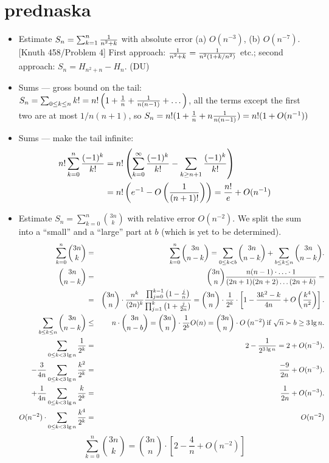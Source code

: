 \documentclass[10pt, a4paper]{article}
\begin{document}
\newpage

\section{prednaska}

\begin{itemize}

\item Estimate $S_n = \sum_{k=1}^n {1\over n^2+k}$ with absolute error (a) $O(n^{-3})$, (b) $O(n^{-7})$. [Knuth 458/Problem 4]
First approach: ${1\over n^2+k}={1\over n^2(1+k/n^2)}$ etc.; second approach: $S_n = H_{n^2+n}-H_n$. (DU)

\item Sums --- gross bound on the tail: $S_n = \sum_{0\le k\le n} k! = n!\left(1+{1\over n}+{1\over n(n-1)}+ \dots\right)$,
all the terms except the first two are at most $1/n(n+1)$, so $S_n = n!(1+{1\over n}+n{1\over n(n-1)}) = n!(1+O(n^{-1}))$

\item Sums --- make the tail infinite:
\begin{align*}
n!\sum_{k=0}^n{(-1)^k\over k!} &= n!\left(\sum_{k=0}^\infty{(-1)^k\over k!}-\sum_{k\ge n+1}{(-1)^k\over k!}\right)\\
                               &= n!\left(e^{-1}-O\left({1\over (n+1)!}\right)\right)= {n!\over e}+O(n^{-1})
\end{align*}

\item Estimate $S_n=\sum_{k=0}^n {3n\choose k}$ with relative error $O(n^{-2})$. We split the sum into a ``small'' and a ``large'' part at $b$ (which is yet to be determined).
\begin{eqnarray*}
\sum_{k=0}^{n} \binom {3n}k&=&\sum_{k=0}^{n} \binom {3n}{n-k}=\sum_{0\leq k<b} \binom {3n}{n-k}+\sum_{b\le k\le n} \binom {3n}{n-k}.\\
\binom{3n}{n-k} &=& \binom{3n}{n} {n(n-1)\cdot\ldots \cdot 1\over (2n+1)(2n+2)\ldots(2n+k)} =\\
                &=& \binom{3n}{n}\cdot\frac{n^k}{(2n)^k}\frac{\prod_{j=0}^{k-1}\left(1-\frac jn\right)}{\prod_{j=1}^k \left(1+\frac j{2n}\right)}=\binom{3n}{n}\cdot\frac{1}{2^k}\cdot\left[1-\frac{3k^2-k}{4n}+O\left(\frac{k^4}{n^2}\right)\right].\\
\sum_{b\le k\le n} \binom {3n}{n-k}&\le &n\cdot \binom{3n}{n-b}=\binom{3n}{n}\cdot \frac{1}{2^b} O(n)=\binom{3n}{n}\cdot O\left(n^{-2}\right) \hbox{if $\sqrt n\succ b\ge 3\lg n$}.\\
\sum_{0\leq k<3\lg n}\frac{1}{2^k}&=&2-\frac{1}{2^{3\lg n}}=2+O(n^{-3}).\\
-\frac{3}{4n}\sum_{0\leq k<3\lg n}\frac{k^2}{2^k}&=&\frac{-9}{2n}+O(n^{-3}).\\
+\frac{1}{4n}\sum_{0\leq k<3\lg n}\frac{k}{2^k}&=&\frac{1}{2n}+O(n^{-3}).\\
O(n^{-2})\cdot\sum_{0\leq k<3\lg n}\frac{k^4}{2^k}&=&O(n^{-2})\\
\end{eqnarray*}
$$\sum_{k=0}^{n} \binom {3n}k=\binom{3n}{n}\cdot\left[2-\frac{4}{n}+ O(n^{-2})\right]$$


\end{itemize}
\end{document}
